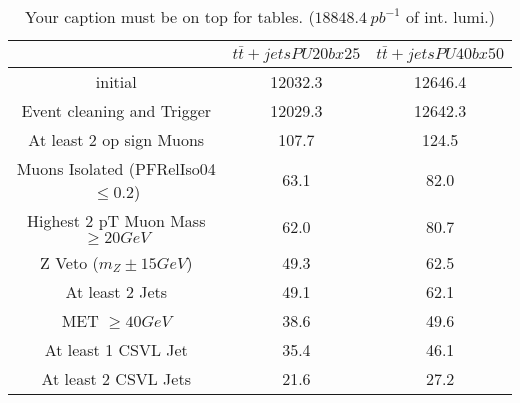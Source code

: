 \documentclass{article}
\begin{document}
\begin{table}
\caption{Your caption must be on top for tables. ($18848.4~pb^{-1}$ of int. lumi.)}
\label{tab:}
\centering
\begin{tabular}{|c|cc|}
\toprule
&$t\bar{t}+jets PU20bx25$	&$t\bar{t}+jets PU40bx50$	\\

\midrule
initial&	12032.3	&12646.4	\\

Event cleaning and Trigger&	12029.3	&12642.3	\\

At least 2 op sign Muons&	107.7	&124.5	\\

Muons Isolated (PFRelIso04$\leq 0.2$)&	63.1	&82.0	\\

Highest 2 pT Muon Mass $\geq 20 GeV$&	62.0	&80.7	\\

Z Veto ($m_{Z}\pm 15 GeV$)&	49.3	&62.5	\\

At least 2 Jets&	49.1	&62.1	\\

MET $\geq 40 GeV$&	38.6	&49.6	\\

At least 1 CSVL Jet&	35.4	&46.1	\\

At least 2 CSVL Jets&	21.6	&27.2	\\

\bottomrule
\end{tabular}
\end{table}
\end{document}
